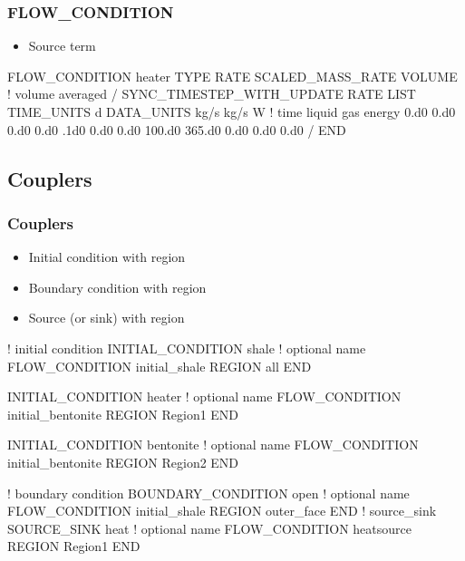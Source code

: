 \documentclass{beamer}
\newcommand\bluecomment[1]{{{\color{blue} #1}}}
\begin{document}
\begin{frame}[fragile]\frametitle{FLOW\_CONDITION}
\begin{itemize}
  \item{Source term}
\end{itemize}

\begin{semiverbatim}
FLOW_CONDITION heater
  TYPE
    RATE SCALED_MASS_RATE VOLUME \bluecomment{! volume averaged}
  /
  SYNC_TIMESTEP_WITH_UPDATE
  RATE LIST
    TIME_UNITS d
    DATA_UNITS kg/s kg/s W
    \bluecomment{! time liquid gas energy}
    0.d0 0.d0 0.d0 0.d0
    .1d0 0.d0 0.d0 100.d0
    365.d0 0.d0 0.d0 0.d0
  /
END
\end{semiverbatim}
\end{frame}

\subsection{Couplers}

\begin{frame}[fragile]\frametitle{Couplers}

\begin{itemize}
  \item Initial condition with region
  \item Boundary condition with region
  \item Source (or sink) with region
\end{itemize}

\begin{semiverbatim}\small
\bluecomment{! initial condition}
INITIAL_CONDITION shale \bluecomment{! optional name}
  FLOW_CONDITION initial_shale
  REGION all
END

INITIAL_CONDITION heater \bluecomment{! optional name}
  FLOW_CONDITION initial_bentonite
  REGION Region1
END

INITIAL_CONDITION bentonite \bluecomment{! optional name}
  FLOW_CONDITION initial_bentonite
  REGION Region2
END
\end{semiverbatim}
\end{frame}

\begin{frame}
\begin{semiverbatim}
\bluecomment{! boundary condition}
BOUNDARY_CONDITION open \bluecomment{! optional name}
  FLOW_CONDITION initial_shale
  REGION outer_face
END
\bluecomment{! source_sink }
SOURCE_SINK heat \bluecomment{! optional name}
  FLOW_CONDITION heatsource
  REGION Region1
END
\end{semiverbatim}
\end{frame}
\end{document}
